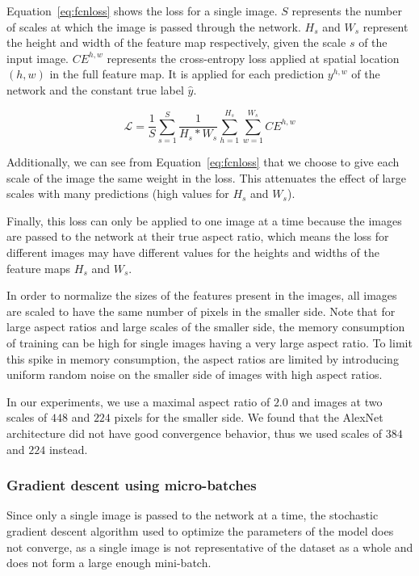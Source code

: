 Equation~\ref{eq:fcnloss} shows the loss for a
single image. $S$ represents the number of scales at which the image
is passed through the network.
$H_s$ and $W_s$ represent the height and width of the feature
map respectively, given the scale $s$ of the input image.
$\mathit{CE}^{h,w}$ represents the cross-entropy loss applied
at spatial location $(h,w)$ in the full feature map. It is applied
for each prediction $y^{h,w}$ of the network and the constant true label
$\hat{y}$.

\begin{equation}\label{eq:fcnloss}
\mathcal{L} = \frac{1}{S} \sum_{s=1}^S \frac{1}{H_s*W_s}
\sum_{h=1}^{H_s} \sum_{w=1}^{W_s} \mathit{CE}^{h,w}
\end{equation}

Additionally, we can see from Equation~\ref{eq:fcnloss} that we choose
to give each scale of the image the same weight in the loss. This
attenuates the effect of large scales with many predictions (high
values for $H_s$ and $W_s$).

Finally, this loss can only be applied to one image at a time because
the images are passed to the network at their true
aspect ratio, which means the loss for different images may have different
values for the heights and widths of the feature maps $H_s$ and $W_s$.

In order to normalize the sizes of the features present in the images,
all images are scaled to have the same
number of pixels in the smaller side. Note that for large aspect
ratios and large scales of the smaller side,
the memory consumption of training can be high for single images
having a very large aspect ratio. To limit this spike in memory
consumption, the aspect ratios are limited by introducing uniform
random noise on the smaller side of images with high aspect ratios.

In our experiments, we use a maximal aspect ratio of $2.0$ and images
at two scales of $448$ and $224$ pixels for the smaller side. We found
that the AlexNet architecture did not have good convergence behavior,
thus we used scales of $384$ and $224$ instead.

\subsubsection{Gradient descent using micro-batches}
Since only a single image is passed to the network at a time, the
stochastic gradient descent algorithm used to optimize the parameters
of the model does not converge, as a single image is not representative
of the dataset as a whole and does not form a large enough mini-batch.

